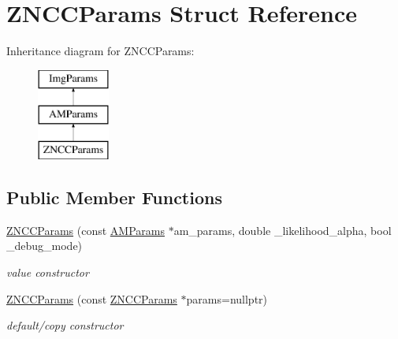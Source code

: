 \hypertarget{structZNCCParams}{\section{Z\-N\-C\-C\-Params Struct Reference}
\label{structZNCCParams}
}
Inheritance diagram for Z\-N\-C\-C\-Params\-:\begin{figure}[H]
\begin{center}
\leavevmode
\includegraphics[height=3.000000cm]{structZNCCParams}
\end{center}
\end{figure}
\subsection*{Public Member Functions}
\begin{DoxyCompactItemize}
\item 
\hypertarget{structZNCCParams_a94a07e3dd34e8bf558d1c21a12d67c8d}{\hyperlink{structZNCCParams_a94a07e3dd34e8bf558d1c21a12d67c8d}{Z\-N\-C\-C\-Params} (const \hyperlink{structAMParams}{A\-M\-Params} $\ast$am\-\_\-params, double \-\_\-likelihood\-\_\-alpha, bool \-\_\-debug\-\_\-mode)}\label{structZNCCParams_a94a07e3dd34e8bf558d1c21a12d67c8d}

\begin{DoxyCompactList}\small\item\em value constructor \end{DoxyCompactList}\item 
\hypertarget{structZNCCParams_a1a42b7a633467359223f5519cb55d699}{\hyperlink{structZNCCParams_a1a42b7a633467359223f5519cb55d699}{Z\-N\-C\-C\-Params} (const \hyperlink{structZNCCParams}{Z\-N\-C\-C\-Params} $\ast$params=nullptr)}\label{structZNCCParams_a1a42b7a633467359223f5519cb55d699}

\begin{DoxyCompactList}\small\item\em default/copy constructor \end{DoxyCompactList}\end{DoxyCompactItemize}
